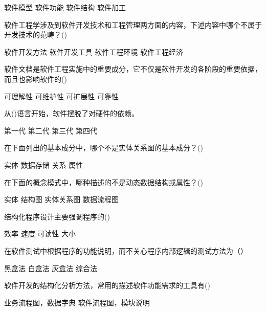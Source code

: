 \documentclass{exam}
\begin{document}
\begin{questions}
\begin{oneparchoices}
		\choice 软件模型
		\correctchoice 软件功能
		\choice 软件结构
		\choice 软件加工
	\end{oneparchoices}
	\question 软件工程学涉及到软件开发技术和工程管理两方面的内容，下述内容中哪个不属于开发技术的范畴？()\\
	\begin{oneparchoices}
		\choice 软件开发方法
		\choice 软件开发工具
		\choice 软件工程环境
		\correctchoice 软件工程经济
	\end{oneparchoices}
	\question 软件文档是软件工程实施中的重要成分，它不仅是软件开发的各阶段的重要依据，而且也影响软件的()\\
	\begin{oneparchoices}
		\choice 可理解性
		\correctchoice 可维护性
		\choice 可扩展性
		\choice 可靠性
	\end{oneparchoices}
	\question 从()语言开始，软件摆脱了对硬件的依赖。\\
	\begin{oneparchoices}
		\choice 第一代
		\choice 第二代
		\correctchoice 第三代
		\choice 第四代
	\end{oneparchoices}
	\question 在下面列出的基本成分中，哪个不是实体关系图的基本成分？()\\
	\begin{oneparchoices}
		\choice 实体
		\correctchoice 数据存储
		\choice 关系
		\choice 属性
	\end{oneparchoices}
	\question 在下面的概念模式中，哪种描述的不是动态数据结构或属性？()\\
	\begin{oneparchoices}
		\choice 实体
		\choice 结构图
		\correctchoice 实体关系图
		\choice 数据流程图
	\end{oneparchoices}
	\question 结构化程序设计主要强调程序的()\\
	\begin{oneparchoices}
		\choice 效率
		\choice 速度
		\correctchoice 可读性
		\choice 大小
	\end{oneparchoices}
	\question 在软件测试中根据程序的功能说明，而不关心程序内部逻辑的测试方法为（）\\
	\begin{oneparchoices}
		\correctchoice 黑盒法
		\choice 白盒法
		\choice 灰盒法
		\choice 综合法
	\end{oneparchoices}
	\question 软件开发的结构化分析方法，常用的描述软件功能需求的工具有()\\
	\begin{oneparchoices}
		\choice 业务流程图，数据字典
		\choice 软件流程图，模块说明\\

\end{oneparchoices}
\end{questions}
\end{document}
